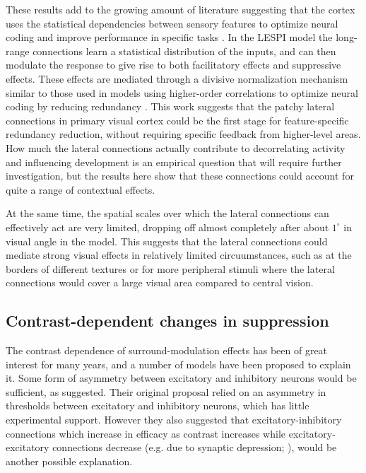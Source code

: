 These results add to the growing amount of literature suggesting that the
cortex uses the statistical dependencies between sensory features to
optimize neural coding \citep{Vinje2000, Simoncelli2001} and improve
performance in specific tasks \citep{Geisler2001}. In the LESPI model
the long-range connections learn a statistical distribution of the
inputs, and can then modulate the response to give rise to both facilitatory
effects and suppressive effects. These effects are mediated through a
divisive normalization mechanism similar to those used in models 
using higher-order correlations to optimize neural coding by
reducing redundancy \citep{Spratling2011, Coen2015}. This work
suggests that the patchy lateral connections in primary visual cortex
could be the first stage for feature-specific redundancy reduction,
without requiring specific feedback from higher-level areas. How much
the lateral connections actually contribute to decorrelating activity and
influencing development is an empirical question that will require
further investigation, but the results here show that these
connections could account for quite a range of contextual effects.

At the same time, the spatial scales over which the lateral connections
can effectively act are very limited, dropping off almost completely
after about $1^\circ$ in visual angle in the model. This suggests that
the lateral connections could mediate strong visual effects in
relatively limited circuumstances, such as at the borders of different
textures or for more peripheral stimuli where the lateral connections
would cover a large visual area compared to central vision.

\subsection{Contrast-dependent changes in suppression}

The contrast dependence of surround-modulation effects has been of
great interest for many years, and a number of models have been
proposed to explain it. Some form of asymmetry between
excitatory and inhibitory neurons would be sufficient, as \cite{Somers1998}
suggested. Their original proposal relied on an asymmetry in
thresholds between excitatory and inhibitory neurons, which has little
experimental support. However they also suggested that
excitatory-inhibitory connections which increase in efficacy as
contrast increases while excitatory-excitatory connections decrease
(e.g. due to synaptic depression; \citealt{Abbott1997, Tsodyks1997}),
would be another possible explanation.

